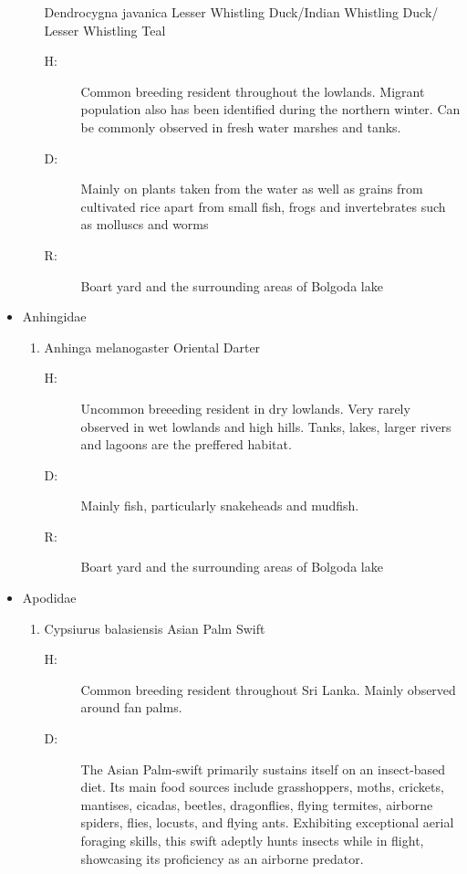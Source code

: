 \begin{itemize}
\begin{enumerate}
Dendrocygna javanica\newline%
Lesser Whistling Duck/Indian Whistling Duck/ Lesser Whistling Teal%
\begin{description}%
\item[H: ]%
Common breeding resident throughout the lowlands. Migrant population also has been identified during the northern winter. Can be commonly observed in fresh water marshes and tanks.%
\item[D: ]%
Mainly on plants taken from the water as well as grains from cultivated rice apart from small fish, frogs and invertebrates such as molluscs and worms%
\item[R: ]%
Boart yard and the surrounding areas of Bolgoda lake%
\end{description}%
\end{enumerate}%
\item%
Anhingidae%
\begin{enumerate}%
\item%
Anhinga melanogaster\newline%
Oriental Darter%
\begin{description}%
\item[H: ]%
Uncommon breeeding resident in dry lowlands. Very rarely observed in wet lowlands and high hills. Tanks, lakes, larger rivers and lagoons are the preffered habitat.%
\item[D: ]%
Mainly fish, particularly snakeheads and mudfish.%
\item[R: ]%
Boart yard and the surrounding areas of Bolgoda lake%
\end{description}%
\end{enumerate}%
\item%
Apodidae%
\begin{enumerate}%
\item%
Cypsiurus balasiensis\newline%
Asian Palm Swift%
\begin{description}%
\item[H: ]%
Common breeding resident throughout Sri Lanka. Mainly observed around fan palms.%
\item[D: ]%
The Asian Palm{-}swift primarily sustains itself on an insect{-}based diet. Its main food sources include grasshoppers, moths, crickets, mantises, cicadas, beetles, dragonflies, flying termites, airborne spiders, flies, locusts, and flying ants. Exhibiting exceptional aerial foraging skills, this swift adeptly hunts insects while in flight, showcasing its proficiency as an airborne predator.%

\end{description}
\end{enumerate}
\end{itemize}
